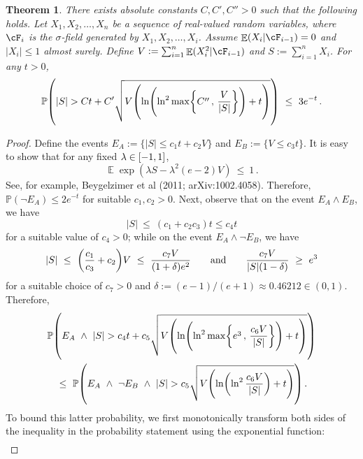 \documentclass[11pt]{article}
\DeclareMathOperator{\E}{\mathbb{E}}
\renewcommand{\P}{\ensuremath{\mathbb{P}}}
\newtheorem{theorem}{Theorem}
\theoremstyle{remark}
\theoremstyle{definition}
\newcommand\braces[1]{\{#1\}}
\renewcommand\abs[1]{|#1|} %
\newcommand\Parens[1]{\mleft(#1\mright)}
\newcommand\Braces[1]{\mleft\{#1\mright\}}
\begin{document}
\begin{theorem}
  There exists absolute constants $C, C', C'' > 0$ such that the
  following holds.
  Let $X_1, X_2, \dotsc, X_n$ be a sequence of real-valued random
  variables, where $\cF_i$ is the $\sigma$-field generated by $X_1, X_2,
  \dotsc, X_i$.
  Assume $\E(X_i|\cF_{i-1}) = 0$ and $\abs{X_i} \leq 1$ almost surely.
  Define $V := \sum_{i=1}^n \E(X_i^2|\cF_{i-1})$ and $S := \sum_{i=1}^n
  X_i$.
  For any $t>0$,
  \[
    \P\Parens{
      |S| >
      C t +
      C' \sqrt{
        V \Parens{
          \ln\Parens{
            \ln^2\max\Braces{ C'' \,,\, \frac{V}{|S|}}
          } + t
        }
      }
    }
    \ \leq \ 3e^{-t}
    \,.
  \]
\end{theorem}
\begin{proof}
  Define the events $E_A := \braces{ |S| \leq c_1 t + c_2 V }$ and
  $E_B := \braces{ V \leq c_3 t }$.
  It is easy to show that for any fixed $\lambda \in \intcc{-1,1}$,
  \begin{equation}
    \E\exp(\lambda S - \lambda^2 (e-2) V) \ \leq \ 1
    \,.
    \label{eq:freedman}
  \end{equation}
  See, for example, Beygelzimer et al (2011; arXiv:1002.4058).
  Therefore, $\P(\neg E_A) \leq 2e^{-t}$ for suitable $c_1, c_2 > 0$.
  Next, observe that on the event $E_A \wedge E_B$, we have
  \[
    |S|
    \ \leq \
    (c_1 + c_2c_3) t \leq c_4 t
  \]
  for a suitable value of $c_4 > 0$; while on the event $E_A \wedge
  \neg E_B$, we have
  \[
    |S|
    \ \leq \
    \Parens{
      \frac{c_1}{c_3} + c_2
    } V
    \ \leq \
    \frac{c_7V}{(1+\delta)e^2}
    \qquad\text{and}\qquad
    \frac{c_7V}{|S|(1-\delta)} \ \geq \ e^3
  \]
  for a suitable choice of $c_7>0$ and $\delta := (e-1)/(e+1) \approx
  0.46212 \in (0,1)$.
  Therefore,
  \begin{multline*}
    \P\Parens{
      E_A
      \ \wedge \
      |S| >
      c_4 t +
      c_5 \sqrt{
        V \Parens{
          \ln\Parens{
            \ln^2\max\Braces{ e^3 \,,\, \frac{c_6V}{|S|} }
          } + t
        }
      }
    }
    \\
    \ \leq \
    \P\Parens{
      E_A \ \wedge \
      \neg E_B \ \wedge \
      |S| >
      c_5 \sqrt{
        V \Parens{
          \ln\Parens{
            \ln^2\frac{c_6V}{|S|}
          } + t
        }
      }
    }
    \,.
  \end{multline*}
  To bound this latter probability, we first monotonically transform
  both sides of the inequality in the probability statement using the
  exponential function:
  \begin{multline*}

\end{multline*}
\end{proof}
\end{document}
